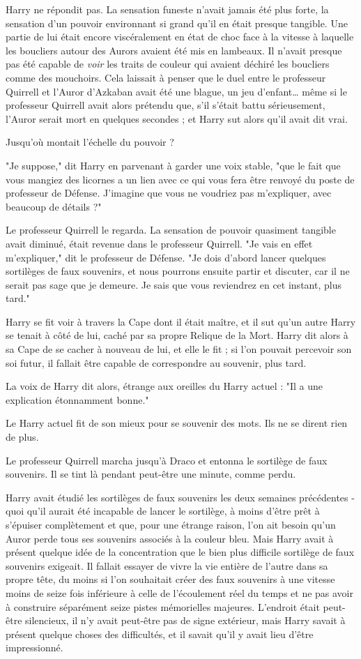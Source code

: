 Harry ne répondit pas. La sensation funeste n'avait jamais été plus forte, la sensation d'un pouvoir environnant si grand qu'il en était presque tangible. Une partie de lui était encore viscéralement en état de choc face à la vitesse à laquelle les boucliers autour des Aurors avaient été mis en lambeaux. Il n'avait presque pas été capable de \emph{voir}  les traits de couleur qui avaient déchiré les boucliers comme des mouchoirs. Cela laissait à penser que le duel entre le professeur Quirrell et l'Auror d'Azkaban avait été une blague, un jeu d'enfant… même si le professeur Quirrell avait alors prétendu que, s'il s'était battu sérieusement, l'Auror serait mort en quelques secondes ; et Harry sut alors qu'il avait dit vrai.

Jusqu'où montait l'échelle du pouvoir ?

"Je suppose," dit Harry en parvenant à garder une voix stable, "que le fait que vous mangiez des licornes a un lien avec ce qui vous fera être renvoyé du poste de professeur de Défense. J'imagine que vous ne voudriez pas m'expliquer, avec beaucoup de détails ?"

Le professeur Quirrell le regarda. La sensation de pouvoir quasiment tangible avait diminué, était revenue dans le professeur Quirrell. "Je vais en effet m'expliquer," dit le professeur de Défense. "Je dois d'abord lancer quelques sortilèges de faux souvenirs, et nous pourrons ensuite partir et discuter, car il ne serait pas sage que je demeure. Je sais que vous reviendrez en cet instant, plus tard."

Harry se fit voir à travers la Cape dont il était maître, et il sut qu'un autre Harry se tenait à côté de lui, caché par sa propre Relique de la Mort. Harry dit alors à sa Cape de se cacher à nouveau de lui, et elle le fit ; si l'on pouvait percevoir son soi futur, il fallait être capable de correspondre au souvenir, plus tard.

La voix de Harry dit alors, étrange aux oreilles du Harry actuel : "Il a une explication étonnamment bonne."

Le Harry actuel fit de son mieux pour se souvenir des mots. Ils ne se dirent rien de plus.

Le professeur Quirrell marcha jusqu'à Draco et entonna le sortilège de faux souvenirs. Il se tint là pendant peut-être une minute, comme perdu.

Harry avait étudié les sortilèges de faux souvenirs les deux semaines précédentes - quoi qu'il aurait été incapable de lancer le sortilège, à moins d'être prêt à s'épuiser complètement et que, pour une étrange raison, l'on ait besoin qu'un Auror perde tous ses souvenirs associés à la couleur bleu. Mais Harry avait à présent quelque idée de la concentration que le bien plus difficile sortilège de faux souvenirs exigeait. Il fallait essayer de vivre la vie entière de l'autre dans sa propre tête, du moins si l'on souhaitait créer des faux souvenirs à une vitesse moins de seize fois inférieure à celle de l'écoulement réel du temps et ne pas avoir à construire séparément seize pistes mémorielles majeures. L'endroit était peut-être silencieux, il n'y avait peut-être pas de signe extérieur, mais Harry savait à présent quelque choses des difficultés, et il savait qu'il y avait lieu d'être impressionné.

